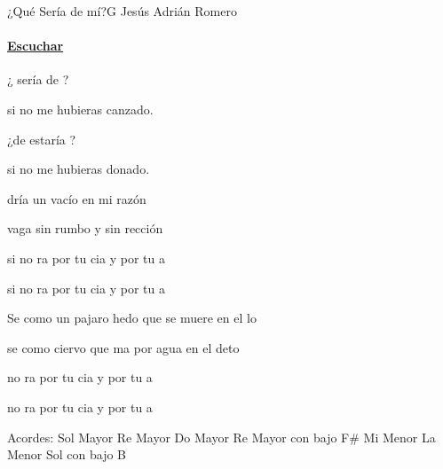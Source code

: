 \documentclass[12pt, spanish]{book}
\begin{document}
    \begin{song}{¿Qué Sería de mí?}{G}
    {} %
    {Jesús Adrián Romero}
    {} %
    {}
        \ifChordBk
        \paragraph{\mbox{}\hfill\protect\href{https://open.spotify.com/intl-es/track/6765SHKbINOPj3EJFnBGMs}{Escuchar}\mbox{}\hfill}
        \fi

        \begin{SBOpGroup}
            ¿ sería de ?

            si no me hubieras canzado.

            ¿de estaría ?

            si no me hubieras donado.
        \end{SBOpGroup}
        \vskip 20pt
        \begin{SBOpGroup}
            dría un vacío en mi razón

            vaga sin rumbo y sin rección

            si no ra por tu cia y por tu a

            si no ra por tu cia y por tu a
        \end{SBOpGroup}
        \vskip 20pt
        \begin{SBOpGroup}
            Se como un pajaro hedo que se muere en el lo

            se como ciervo que ma por agua en el deto

             no ra por tu cia y por tu a

             no ra por tu cia y por tu a
        \end{SBOpGroup}

        \ifChordBk
        \begin{SBOpGroup}
            Acordes:\break
            \upchord{\G}\qquad Sol Mayor \hfill
            \upchord{\D}\qquad Re Mayor \hfill\null\break
            \upchord{\C}\qquad Do Mayor \hfill
            \upchord{\DFs}\qquad Re Mayor con bajo F\# \hfill\null\break
            \upchord{\Em}\qquad Mi Menor \hfill
            \upchord{\Am}\qquad La Menor \hfill\null\break
            \upchord{\GB}\qquad Sol con bajo B \hfill
        \end{SBOpGroup}
        \fi
    \end{song}

    

    \ifChordBk
        
    \theendnotes
        
    
    
    \fi

    
\end{document}
